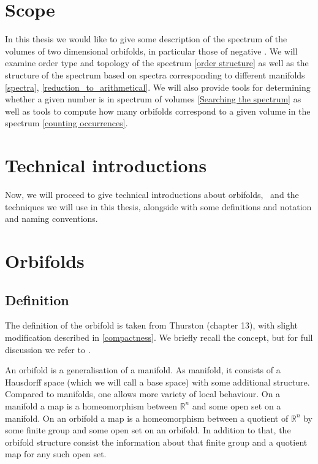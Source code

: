 
\section{Scope}
In this thesis we would like to give some description of the spectrum of the volumes 
of two dimensional orbifolds, in particular those of negative \Eoc. 
We will examine order type and topology of the spectrum \ref{order structure} 
as well as the structure 
of the spectrum based on spectra corresponding to different manifolds \ref{spectra}, 
\ref{reduction_to_arithmetical}.
We will also provide tools for determining whether a given number is in spectrum of volumes 
\ref{Searching the spectrum} as 
well as tools to compute how many orbifolds correspond to a given volume in the spectrum 
\ref{counting occurrences}. 

\section{Technical introductions}
Now, we will proceed to give technical introductions about orbifolds, \Eoc\ and the 
techniques we will use in this thesis, alongside with some definitions and notation and 
naming conventions. 
 
\section{Orbifolds}
\subsection{Definition}
The definition of the orbifold is taken from Thurston \cite{Thurston1979} (chapter 13), 
with slight modification described in \ref{compactness}. 
We briefly recall the concept, but for full discussion we refer to \cite{Thurston1979}. 

An orbifold is a generalisation of a manifold. As manifold, it consists of a Hausdorff space 
(which we will call a base space)
with some additional structure. 
Compared to manifolds, one allows more variety of local behaviour. 
On a manifold a map is a homeomorphism between $\mathbb{R}^n$ and some open set on a manifold. 
On an orbifold a map is a homeomorphism between a quotient of $\mathbb{R}^n$ by some 
finite group and some open set on an orbifold. 
In addition to that, the orbifold structure consist the information about that finite group 
and a quotient map for any such open set. 

